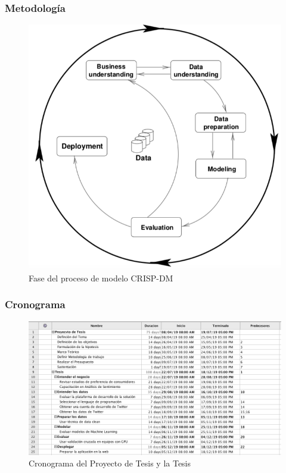 \documentclass{beamer}
\begin{document}
%
\begin{frame}
\frametitle{Metodolog\'ia}
\begin{figure}[H]
\centering
\includegraphics[scale=0.25]{../chapters/img/Ch06_CRISP.PNG}
\caption{Fase del proceso de modelo CRISP-DM}
\end{figure}
\end{frame}



%
\begin{frame}
\frametitle{Cronograma}
\begin{figure}[H]
\centering
\includegraphics[scale=0.3]{../chapters/img/Ch07_schedule.PNG}
\caption{Cronograma del Proyecto de Tesis y la Tesis}
\end{figure}
\end{frame}
\end{document}
